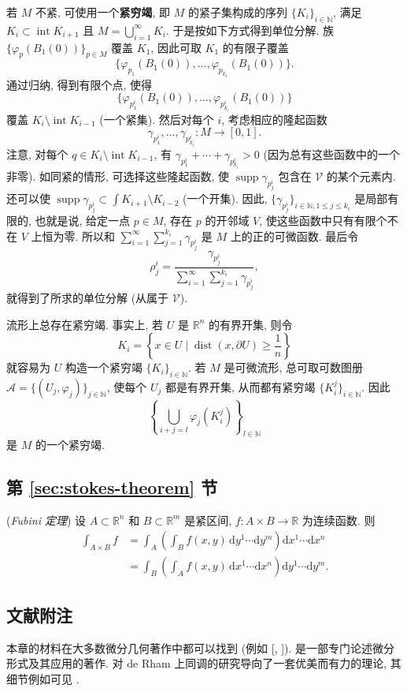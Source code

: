 \begin{enumerate}[label=(\arabic*),leftmargin=*]
{\begin{RiemannProof}
若 $M$ 不紧, 可使用一个\textbf{紧穷竭}, 即 $M$ 的紧子集构成的序列 $\{K_i\}_{i\in\mathbb{N}}$, 满足 $K_i\subset\operatorname{int}K_{i+1}$ 且 $M=\bigcup_{i=1}^\infty K_i$. 于是按如下方式得到单位分解. 族 $\{\varphi_p(B_1(0))\}_{p\in M}$ 覆盖 $K_1$, 因此可取 $K_1$ 的有限子覆盖
\[
  \{\varphi_{p_1}(B_1(0)),\ldots,\varphi_{p_{k_1}}(B_1(0))\}.
\]
通过归纳, 得到有限个点, 使得
\[
  \{\varphi_{p_1^i}(B_1(0)),\ldots,\varphi_{p_{k_i}^i}(B_1(0))\}
\]
覆盖 $K_i\setminus\operatorname{int}K_{i-1}$ (一个紧集). 然后对每个 $i$, 考虑相应的隆起函数
\[
  \gamma_{p_1^i},\ldots,\gamma_{p_{k_i}^i}:M\to[0,1].
\]
注意, 对每个 $q\in K_i\setminus\operatorname{int}K_{i-1}$, 有 $\gamma_{p_1^i}+\cdots+\gamma_{p_{k_i}^i}>0$ (因为总有这些函数中的一个非零). 如同紧的情形, 可选择这些隆起函数, 使 $\operatorname{supp}\gamma_{p_j^i}$ 包含在 $\mathcal{V}$ 的某个元素内. 还可以使 $\operatorname{supp}\gamma_{p_j^i}\subset\int K_{i+1}\setminus K_{i-2}$ (一个开集). 因此, $\{\gamma_{p_j^i}\}_{i\in\mathbb{N},1\leq j\leq k_i}$ 是局部有限的, 也就是说, 给定一点 $p\in M$, 存在 $p$ 的开邻域 $V$, 使这些函数中只有有限个不在 $V$ 上恒为零. 所以和 $\sum_{i=1}^\infty\sum_{j=1}^{k_i}\gamma_{p_j^i}$ 是 $M$ 上的正的可微函数. 最后令
\[
  \rho_j^i=\frac{\gamma_{p_j^i}}{\sum_{i=1}^\infty\sum_{j=1}^{k_i}\gamma_{p_j^i}},
\]
就得到了所求的单位分解 (从属于 $\mathcal{V}$).
\end{RiemannProof}

\begin{RiemannRemark}\label{rem:compact-exhaustions-of-manifolds}
流形上总存在紧穷竭. 事实上, 若 $U$ 是 $\mathbb{R}^n$ 的有界开集, 则令
\[
  K_i=\left\{x\in U\mid\operatorname{dist}(x,\partial U)\geq\frac{1}{n}\right\}
\]
就容易为 $U$ 构造一个紧穷竭 $\{K_i\}_{i\in\mathbb{N}}$. 若 $M$ 是可微流形, 总可取可数图册 $\mathcal{A}=\{(U_j,\varphi_j)\}_{j\in\mathbb{N}}$, 使每个 $U_j$ 都是有界开集, 从而都有紧穷竭 $\{K_i^j\}_{i\in\mathbb{N}}$. 因此
\[
  \left\{\bigcup_{i+j=l}\varphi_j\left(K_i^j\right)\right\}_{l\in\mathbb{N}}
\]
是 $M$ 的一个紧穷竭.
\end{RiemannRemark}
}
\end{enumerate}

\subsection{第 \ref{sec:stokes-theorem} 节}\label{subsec:notes-stokes-theorem}

(\emph{Fubini 定理}) 设 $A\subset\mathbb{R}^n$ 和 $B\subset\mathbb{R}^m$ 是紧区间, $f:A\times B\to\mathbb{R}$ 为连续函数. 则
\begin{align*}
  \int_{A\times B}f
  &=\int_A\left(\int_B f(x,y)\,\mathrm{d}y^1\cdots\mathrm{d}y^m\right)
    \mathrm{d}x^1\cdots\mathrm{d}x^n\\
  &=\int_B\left(\int_A f(x,y)\,\mathrm{d}x^1\cdots\mathrm{d}x^n\right)
    \mathrm{d}y^1\cdots\mathrm{d}y^m.
\end{align*}

\subsection{文献附注}\label{subsec:differential-forms-literature}

本章的材料在大多数微分几何著作中都可以找到 (例如 [, ]).  是一部专门论述微分形式及其应用的著作. 对 de Rham 上同调的研究导向了一套优美而有力的理论, 其细节例如可见 .
